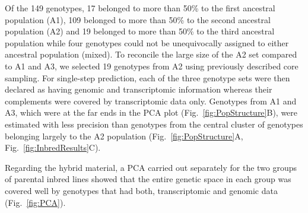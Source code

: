 \documentclass[12pt,titlepage]{article}
\begin{document}
Of the 149 genotypes, 17 belonged to more than 50\% to the first ancestral
population (A1), 109 belonged to more than 50\% to the second ancestral
population (A2) and 19 belonged to more than 50\% to the third ancestral
population while four genotypes could not be unequivocally assigned to either
ancestral population (mixed).
To reconcile the large size of the A2 set compared to A1 and A3, we selected 19 
genotypes from A2 using previously described core sampling.
For single-step prediction, each of the three genotype sets were then declared
as having genomic and transcriptomic information whereas their complements were
covered by transcriptomic data only.
Genotypes from A1 and A3, which were at the far ends in the PCA plot 
(Fig.~\ref{fig:PopStructure}B), were estimated with less precision than genotypes
from the central cluster of genotypes belonging largely to the A2 population
(Fig.~\ref{fig:PopStructure}A, Fig.~\ref{fig:InbredResults}C).

Regarding the hybrid material, a PCA carried out separately for the two groups
of parental inbred lines showed that the entire genetic space in each group 
was covered well by genotypes that had both, transcriptomic and genomic data 
(Fig.~\ref{fig:PCA}).
\end{document}
